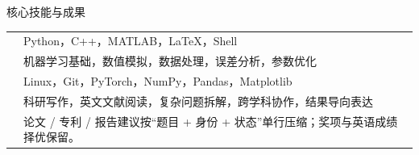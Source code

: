 \documentclass[10pt,a4paper,fontset=none]{ctexart}
\makeatletter
\renewcommand{\arraystretch}{1.00}
\newlength{\ResumeSkillLabelWidth}
\newlength{\ResumeSkillColumnGap}
\newenvironment{ResumeSkillTable}{%
  \begingroup
  \footnotesize
  \setlength{\tabcolsep}{0pt}
  \renewcommand{\arraystretch}{1.00}
  \begin{tabular*}{\linewidth}{@{}l@{\hspace{\ResumeSkillColumnGap}}l@{}}
}{%
  \end{tabular*}\par
  \endgroup
}
\makeatother
\begin{document}
\begin{ResumeModule}[Tight]{核心技能与成果}
\begin{ResumeSkillTable}
  \makebox[\ResumeSkillLabelWidth][l]{\strut\bfseries\color{PrimaryDark} 编程} & \strut Python，C++，MATLAB，LaTeX，Shell \\
  \makebox[\ResumeSkillLabelWidth][l]{\strut\bfseries\color{PrimaryDark} 仿真与建模} & \strut 机器学习基础，数值模拟，数据处理，误差分析，参数优化 \\
  \makebox[\ResumeSkillLabelWidth][l]{\strut\bfseries\color{PrimaryDark} 工程与工具} & \strut Linux，Git，PyTorch，NumPy，Pandas，Matplotlib \\
  \makebox[\ResumeSkillLabelWidth][l]{\strut\bfseries\color{PrimaryDark} 核心能力} & \strut 科研写作，英文文献阅读，复杂问题拆解，跨学科协作，结果导向表达 \\
  \makebox[\ResumeSkillLabelWidth][l]{\strut\bfseries\color{PrimaryDark} 代表成果} & \strut 论文 / 专利 / 报告建议按“题目 + 身份 + 状态”单行压缩；奖项与英语成绩择优保留。
\end{ResumeSkillTable}
\end{ResumeModule}
\end{document}
